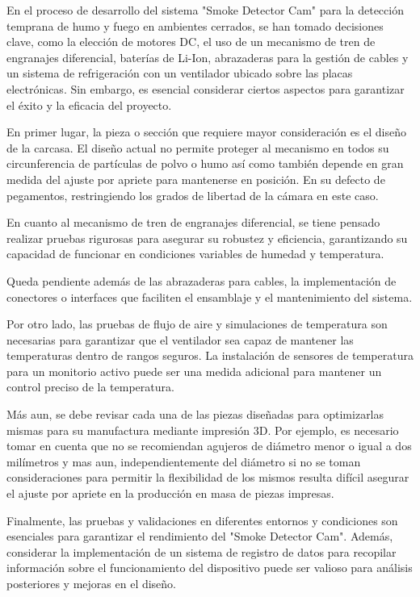 En el proceso de desarrollo del sistema "Smoke Detector Cam" para la detección temprana de humo y fuego en ambientes cerrados, se han tomado decisiones clave, como la elección de motores DC, el uso de un mecanismo de tren de engranajes diferencial, baterías de Li-Ion, abrazaderas para la gestión de cables y un sistema de refrigeración con un ventilador ubicado sobre las placas electrónicas. Sin embargo, es esencial considerar ciertos aspectos para garantizar el éxito y la eficacia del proyecto.

En primer lugar, la pieza o sección que requiere mayor consideración es el diseño de la carcasa. El diseño actual no permite proteger al mecanismo en todos su circunferencia de partículas de polvo o humo así como también depende en gran medida del ajuste por apriete para mantenerse en posición. En su defecto de pegamentos, restringiendo los grados de libertad de la cámara en este caso.

En cuanto al mecanismo de tren de engranajes diferencial, se tiene pensado realizar pruebas rigurosas para asegurar su robustez y eficiencia, garantizando su capacidad de funcionar en condiciones variables de humedad y temperatura.

Queda pendiente además de las abrazaderas para cables, la implementación de conectores o interfaces que faciliten el ensamblaje y el mantenimiento del sistema.

Por otro lado, las pruebas de flujo de aire y simulaciones de temperatura son necesarias para garantizar que el ventilador sea capaz de mantener las temperaturas dentro de rangos seguros. La instalación de sensores de temperatura para un monitorio activo puede ser una medida adicional para mantener un control preciso de la temperatura.

Más aun, se debe revisar cada una de las piezas diseñadas para optimizarlas mismas para su manufactura mediante impresión 3D. Por ejemplo, es necesario tomar en cuenta que no se recomiendan agujeros de diámetro menor o igual a dos milímetros y mas aun, independientemente del diámetro si no se toman consideraciones para permitir la flexibilidad de los mismos resulta difícil asegurar el ajuste por apriete en la producción en masa de piezas impresas.

Finalmente, las pruebas y validaciones en diferentes entornos y condiciones son esenciales para garantizar el rendimiento del "Smoke Detector Cam". Además, considerar la implementación de un sistema de registro de datos para recopilar información sobre el funcionamiento del dispositivo puede ser valioso para análisis posteriores y mejoras en el diseño.